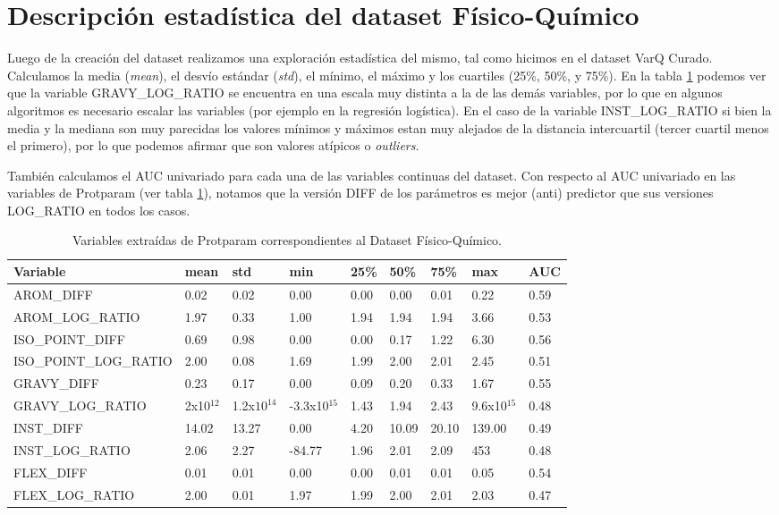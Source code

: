 
\section{Descripción estadística del dataset Físico-Químico}

Luego de la creación del dataset realizamos una exploración estadística del mismo, tal como hicimos en el dataset VarQ Curado. Calculamos la media (\textit{mean}), el desvío estándar (\textit{std}), el mínimo, el máximo y los cuartiles (25\%, 50\%, y 75\%). En la tabla \ref{tab:protparam_vars} podemos ver que la variable GRAVY\_LOG\_RATIO se encuentra en una escala muy distinta a la de las demás variables, por lo que en algunos algoritmos es necesario escalar las variables (por ejemplo en la regresión logística). En el caso de la variable INST\_LOG\_RATIO si bien la media y la mediana son muy parecidas los valores mínimos y máximos estan muy alejados de la distancia intercuartil (tercer cuartil menos el primero), por lo que podemos afirmar que son valores atípicos o \textit{outliers}.

También calculamos el AUC univariado para cada una de las variables continuas del dataset. Con respecto al AUC univariado en las variables de Protparam (ver tabla \ref{tab:protparam_vars}), notamos que la versión DIFF de los parámetros es mejor (anti) predictor que sus versiones LOG\_RATIO en todos los casos.


\begin{table}[H]
\centering
\begin{tabular}{|l|l|l|l|l|l|l|l|l|}
\hline
Variable & mean & std & min & 25\% & 50\%  & 75\% & max & AUC \\ \hline
AROM\_DIFF  & 0.02  & 0.02  & 0.00 & 0.00 & 0.00  & 0.01 & 0.22  & 0.59 \\ \hline
AROM\_LOG\_RATIO & 1.97 & 0.33 & 1.00 & 1.94 & 1.94  & 1.94 & 3.66  & 0.53 \\ \hline
ISO\_POINT\_DIFF & 0.69  & 0.98 & 0.00  & 0.00 & 0.17  & 1.22 & 6.30  & 0.56 \\ \hline
ISO\_POINT\_LOG\_RATIO & 2.00 & 0.08 & 1.69 & 1.99 & 2.00  & 2.01 & 2.45  & 0.51 \\ \hline
GRAVY\_DIFF & 0.23 & 0.17 & 0.00 & 0.09 & 0.20  & 0.33 & 1.67  & 0.55 \\ \hline
GRAVY\_LOG\_RATIO & 2x10$^{12}$ & 1.2x$10^{14}$ & -3.3x10$^{15}$ & 1.43 & 1.94 & 2.43 & 9.6x10$^{15}$ & 0.48 \\\hline
INST\_DIFF & 14.02 & 13.27 & 0.00 & 4.20 & 10.09 & 20.10 & 139.00 & 0.49 \\ \hline
INST\_LOG\_RATIO & 2.06 & 2.27 & -84.77 & 1.96 & 2.01  & 2.09 & 453 & 0.48 \\ \hline
FLEX\_DIFF & 0.01 & 0.01 & 0.00 & 0.00 & 0.01  & 0.01  & 0.05 & 0.54 \\ \hline
FLEX\_LOG\_RATIO & 2.00 & 0.01 & 1.97 & 1.99 & 2.00  & 2.01  & 2.03 & 0.47 \\ \hline
\end{tabular}
\caption{Variables extraídas de Protparam correspondientes al Dataset Físico-Químico.}
\label{tab:protparam_vars}
\end{table}

